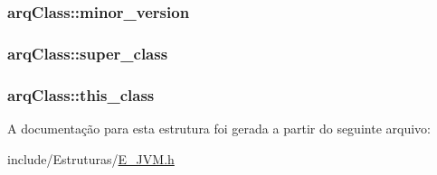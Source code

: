\subsubsection[{minor\+\_\+version}]{ arq\+Class\+::minor\+\_\+version}\label{structarq_class_a90b447e4eea035e1dd5fb45360a6a09f}
\hypertarget{structarq_class_a7bd81d496166908031c40895ed667ada}{}
\subsubsection[{super\+\_\+class}]{ arq\+Class\+::super\+\_\+class}\label{structarq_class_a7bd81d496166908031c40895ed667ada}
\hypertarget{structarq_class_a0fa1b4b35fcc35e25fff7563f1ce7b2b}{}
\subsubsection[{this\+\_\+class}]{ arq\+Class\+::this\+\_\+class}\label{structarq_class_a0fa1b4b35fcc35e25fff7563f1ce7b2b}


A documentação para esta estrutura foi gerada a partir do seguinte arquivo\+:\begin{DoxyCompactItemize}
\item 
include/\+Estruturas/\hyperlink{_e___j_v_m_8h}{E\+\_\+\+J\+V\+M.\+h}\end{DoxyCompactItemize}
